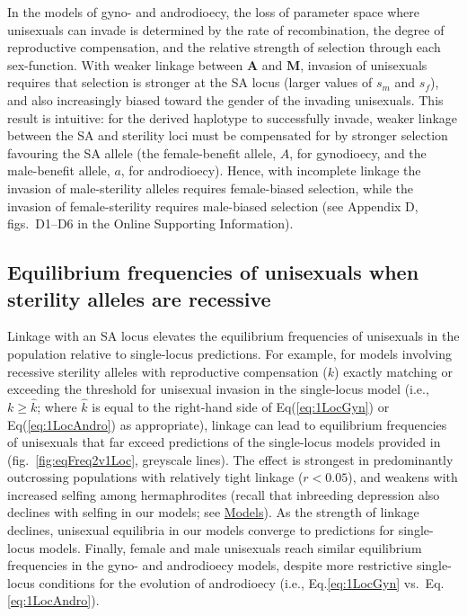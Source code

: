 \documentclass{article}
\begin{document}
In the models of gyno- and androdioecy, the loss of parameter space where unisexuals can invade is determined by the rate of recombination, the degree of reproductive compensation, and the relative strength of selection through each sex-function. With weaker linkage between $\mathbf{A}$ and $\mathbf{M}$, invasion of unisexuals requires that selection is stronger at the SA locus (larger values of $s_m$ and $s_f$), and also increasingly biased toward the gender of the invading unisexuals. This result is intuitive: for the derived haplotype to successfully invade, weaker linkage between the SA and sterility loci must be compensated for by stronger selection favouring the SA allele (the female-benefit allele, $A$, for gynodioecy, and the male-benefit allele, $a$, for androdioecy). Hence, with incomplete linkage the invasion of male-sterility alleles requires female-biased selection, while the invasion of female-sterility requires male-biased selection (see Appendix D, figs.~D1--D6 in the Online Supporting Information). 

\subsection*{Equilibrium frequencies of unisexuals when sterility alleles are recessive}

Linkage with an SA locus elevates the equilibrium frequencies of unisexuals in the population relative to single-locus predictions. For example, for models involving recessive sterility alleles with reproductive compensation ($k$) exactly matching or exceeding the threshold for unisexual invasion in the single-locus model (i.e., $k \geq \hat{k}$; where $\hat{k}$ is equal to the right-hand side of Eq(\ref{eq:1LocGyn}) or Eq(\ref{eq:1LocAndro}) as appropriate), linkage can lead to equilibrium frequencies of unisexuals that far exceed predictions of the single-locus models provided in \citet{Charlesworth1978a} (fig.~\ref{fig:eqFreq2v1Loc}, greyscale lines). The effect is strongest in predominantly outcrossing populations with relatively tight linkage ($r < 0.05$), and weakens with increased selfing among hermaphrodites (recall that inbreeding depression also declines with selfing in our models; see \hyperref[sec:Models]{Models}). As the strength of linkage declines, unisexual equilibria in our models converge to predictions for single-locus models. Finally, female and male unisexuals reach similar equilibrium frequencies in the gyno- and androdioecy models, despite more restrictive single-locus conditions for the evolution of androdioecy (i.e., Eq.\ref{eq:1LocGyn} vs.~Eq.\ref{eq:1LocAndro}).
\end{document}

